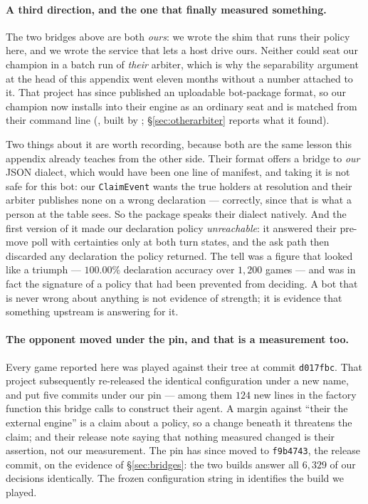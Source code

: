 \documentclass[11pt,letterpaper]{article}
\begin{document}
\paragraph{A third direction, and the one that finally measured something.} The
two bridges above are both \emph{ours}: we wrote the shim that runs their policy
here, and we wrote the service that lets a host drive ours. Neither could seat
our champion in a batch run of \emph{their} arbiter, which is why the
separability argument at the head of this appendix went eleven months without a
number attached to it. That project has since published an uploadable
bot-package format, so our champion now installs into their engine as an
ordinary seat and is matched from their command line
(, built by ; \S\ref{sec:otherarbiter}
reports what it found).

Two things about it are worth recording, because both are the same lesson this
appendix already teaches from the other side. Their format offers a bridge to
\emph{our} JSON dialect, which would have been one line of manifest, and taking
it is not safe for this bot: our \texttt{ClaimEvent} wants the true holders at
resolution and their arbiter publishes none on a wrong declaration --- correctly,
since that is what a person at the table sees. So the package speaks their
dialect natively. And the first version of it made our declaration policy
\emph{unreachable}: it answered their pre-move poll with certainties only at
both turn states, and the ask path then discarded any declaration the policy
returned. The tell was a figure that looked like a triumph --- $100.00\%$
declaration accuracy over $1{,}200$ games --- and was in fact the signature of a
policy that had been prevented from deciding. A bot that is never wrong about
anything is not evidence of strength; it is evidence that something upstream is
answering for it.

\paragraph{The opponent moved under the pin, and that is a measurement too.}
Every game reported here was played against their tree at commit
\texttt{d017fbc}. That project subsequently re-released the identical
configuration under a new name, and put
five commits under our pin --- among them $124$ new lines in the factory
function this bridge calls to construct their agent. A margin against ``their
the external engine'' is a claim about a policy, so a change beneath it threatens the claim;
and their release note saying that nothing measured changed is their assertion,
not our measurement. The pin has since moved to \texttt{f9b4743}, the release
commit, on the evidence of \S\ref{sec:bridges}: the two builds answer all
$6{,}329$ of our decisions identically. The frozen configuration string in
 identifies the build we played.
\end{document}
